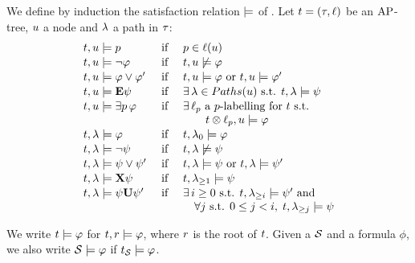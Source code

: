 \begin{definition}%
We define by induction the satisfaction relation $\models$ of
\QCTLs. Let   $t=(\tau,\ell)$ be
an $\textnormal{AP}$- tree, 
$u$  a node and $\tpath$  a path in $\tau$:
\[
\begin{array}{lcl}
  \ltree,\noeud\modelst p 			& \mbox{ if } & p\in\lab(\noeud)\\[1pt]
  \ltree,\noeud\modelst \neg \phi		& \mbox{ if } & \ltree,\noeud\not\modelst \phi\\[1pt]
  \ltree,\noeud\modelst \phi \ou \phi'		& \mbox{ if } & \ltree,\noeud \modelst \phi \mbox{ or    }\ltree,\noeud\modelst \phi' \\[1pt]
  \ltree,\noeud\modelst \E\psi			& \mbox{ if } & \exists\,\tpath\in\tPaths(\noeud) \mbox{      s.t. }\ltree,\tpath\modelst \psi \\[1pt]
  \ltree,\noeud\modelst \existsp \phi & \mbox{ if }
  & \exists\,\plab \mbox{ a $p$-\labeling for
    $\ltree$ s.t.
    }\\
  & & \quad \quad  \ltree\prodlab\plab,\noeud\modelst\phi\\[1pt]
\ltree,\tpath\modelst \phi 			& \mbox{ if } & \ltree,\tpath_{0}\modelst\phi \\[1pt] 
\ltree,\tpath\modelst \neg \psi 		& \mbox{ if }
&  \ltree,\tpath\not\modelst \psi \\[1pt] 
\ltree,\tpath\modelst \psi \ou \psi'			& \mbox{ if } & \ltree,\tpath \modelst \psi \mbox{ or }\ltree,\tpath\modelst \psi' \\[1pt] 
\ltree,\tpath\modelst \X\psi 				& \mbox{ if } & \ltree,\tpath_{\geq 1}\modelst \psi \\[1pt] 
\ltree,\tpath\modelst \psi\until\psi' 		& \mbox{ if }
& \exists\, i\geq 0 \mbox{ s.t.    }\ltree,\tpath_{\geq
                                                                i}\modelst\psi' \text{ and }\\
  & & \quad \forall j \text{ s.t. }0\leq j <i,\; \ltree,\tpath_{\geq j}\modelst\psi
\end{array}
\]
\end{definition}

We write $t\models\varphi$ for $t,r\models\varphi$,
where $r$ is the root of $t$.     Given a \KS $\KS$  and a
\QCTLs formula $\phi$, we also write $\KS\modelst\phi$ if
$\unfold[\KS]{\sstate}\modelst\phi$.


